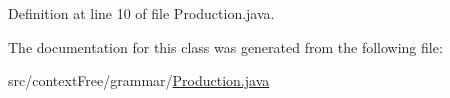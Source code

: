 Definition at line 10 of file Production.\-java.



The documentation for this class was generated from the following file\-:\begin{DoxyCompactItemize}
\item 
src/context\-Free/grammar/\hyperlink{_production_8java}{Production.\-java}\end{DoxyCompactItemize}
